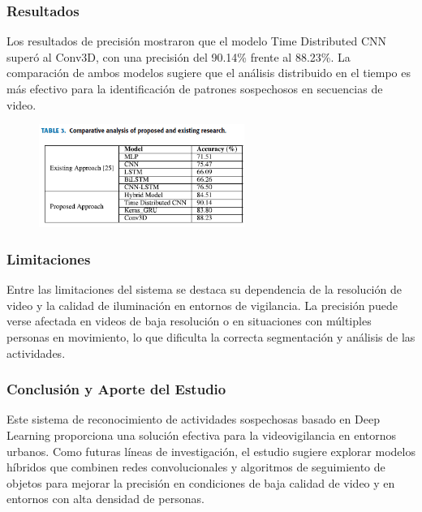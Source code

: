 \documentclass[listof=nochaptergap,12pt,times,authoryear]{report}
\begin{document}
\subsubsection{Resultados}
Los resultados de precisión mostraron que el modelo Time Distributed CNN superó al Conv3D, con una precisión del 90.14\% frente al 88.23\%. La comparación de ambos modelos sugiere que el análisis distribuido en el tiempo es más efectivo para la identificación de patrones sospechosos en secuencias de video.

\begin{figure}[h] %
    \centering
    \includegraphics[width=0.6\textwidth]{re7.png} %
    \label{fig:ejemplo} %
\end{figure}

\subsubsection{Limitaciones}
Entre las limitaciones del sistema se destaca su dependencia de la resolución de video y la calidad de iluminación en entornos de vigilancia. La precisión puede verse afectada en videos de baja resolución o en situaciones con múltiples personas en movimiento, lo que dificulta la correcta segmentación y análisis de las actividades.

\subsubsection{Conclusión y Aporte del Estudio}
Este sistema de reconocimiento de actividades sospechosas basado en Deep Learning proporciona una solución efectiva para la videovigilancia en entornos urbanos. Como futuras líneas de investigación, el estudio sugiere explorar modelos híbridos que combinen redes convolucionales y algoritmos de seguimiento de objetos para mejorar la precisión en condiciones de baja calidad de video y en entornos con alta densidad de personas.
\end{document}
